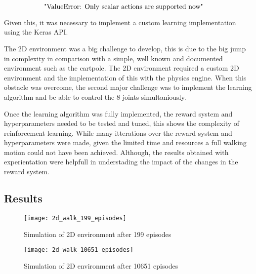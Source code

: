 $\makebox[\linewidth]{"ValueError: Only scalar actions are supported now"}$

Given this, it was necessary to implement a custom learning implementation using the Keras API.

The 2D environment was a big challenge to develop, this is due to the big jump in complexity in comparison with a simple, well known and documented environment such as the cartpole.
The 2D environment required a custom 2D environment and the implementation of this with the physics engine. When this obstacle was overcome, the second major challenge was to implement the learning algorithm
and be able to control the 8 joints simultaniously.

Once the learning algorithm was fully implemented, the reward system and hyperparameters needed to be tested and tuned, this shows the complexity of reinforcement learning. While many itterations over the reward system and hyperparameters were made, given the limited time and resources a full walking motion could not have been achieved.
Although, the results obtained with experientation were helpfull in understading the impact of the changes in the reward system.
\subsection*{Results}
\begin{figure}[H]
    \centering
    \texttt{[image: 2d\_walk\_199\_episodes]}
    \caption{Simulation of 2D environment after 199 episodes}
\end{figure}
\begin{figure}[H]
    \centering
    \texttt{[image: 2d\_walk\_10651\_episodes]}
    \caption{Simulation of 2D environment after 10651 episodes}
\end{figure}

